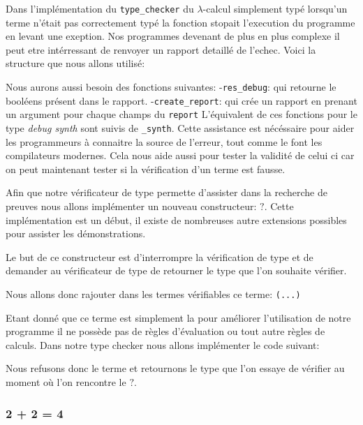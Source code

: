 \documentclass {article}
\newcommand{\codefrom}[3]
           {}
\theoremstyle{definition}
\theoremstyle{remark}
\newcommand{\fun}[1]{\lstinline!#1!}
\begin{document}
Dans l'implémentation du \fun{type_checker} du $\lambda$-calcul simplement typé lorsqu'un terme n'était pas
correctement typé la fonction stopait l'execution du programme en levant une exeption.
Nos programmes devenant de plus en plus complexe il peut etre intérressant de renvoyer un rapport detaillé
de l'echec. Voici la structure que nous allons utilisé:

\codefrom{dependent}{lambda}{debug}

Nous aurons aussi besoin des fonctions suivantes: 
-\fun{res_debug}: qui retourne le booléens présent dans le rapport.    
-\fun{create_report}: qui crée un rapport en prenant un argument pour chaque champs du \fun{report}
L'équivalent de ces fonctions pour le type \emph{debug synth} sont suivis de \fun{_synth}.
Cette assistance est nécéssaire pour aider les programmeurs à connaitre la source de l'erreur,
tout comme le font les compilateurs modernes. Cela nous aide aussi pour tester la validité de celui 
ci car on peut maintenant tester si la vérification d'un terme est fausse.

Afin que notre vérificateur de type permette d'assister dans la recherche de preuves
nous allons implémenter un nouveau constructeur: $?$.
Cette implémentation est un début, il existe de nombreuses autre extensions possibles
pour assister les démonstrations.

Le but de ce constructeur est d'interrompre la vérification de type et de demander au vérificateur de type de
retourner le type que l'on souhaite vérifier. %

Nous allons donc rajouter dans les termes vérifiables ce terme:
\codefrom{dependent}{lambda}{inTm_head} \lstinline!(...)!
\codefrom{dependent}{lambda}{what}

Etant donné que ce terme est simplement la pour améliorer l'utilisation de notre programme
il ne possède pas de règles d'évaluation ou tout autre règles de calculs.
Dans notre type checker nous allons implémenter le code suivant:

\codefrom{dependent}{lambda}{check_what}

Nous refusons donc le terme et retournons le type que l'on essaye de vérifier au moment
où l'on rencontre le $?$.

\subsubsection{2 + 2 = 4}
\end{document}
